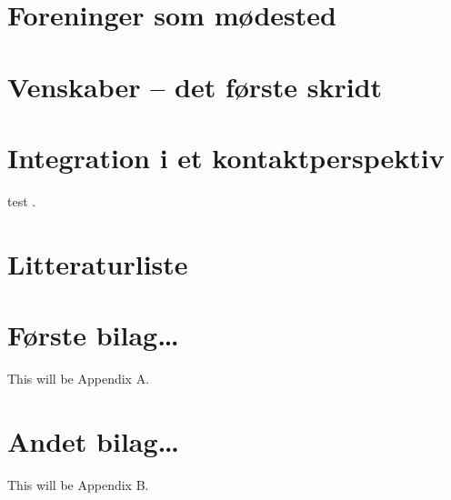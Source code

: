 \documentclass[
]{book}
\begin{document}
\hypertarget{kap5}{%
\chapter{Foreninger som mødested}\label{kap5}}

\hypertarget{kap6}{%
\chapter{Venskaber -- det første skridt}\label{kap6}}

\hypertarget{kap7}{%
\chapter{Integration i et kontaktperspektiv}\label{kap7}}

test \citep{xie2015}.

\hypertarget{litteraturliste}{%
\chapter*{Litteraturliste}\label{litteraturliste}}

\hypertarget{appendix-bilag}{%
\appendix}


\hypertarget{bilag1}{%
\chapter{Første bilag\ldots{}}\label{bilag1}}

This will be Appendix A.

\hypertarget{bilag2}{%
\chapter{Andet bilag\ldots{}}\label{bilag2}}

This will be Appendix B.

  
\end{document}
